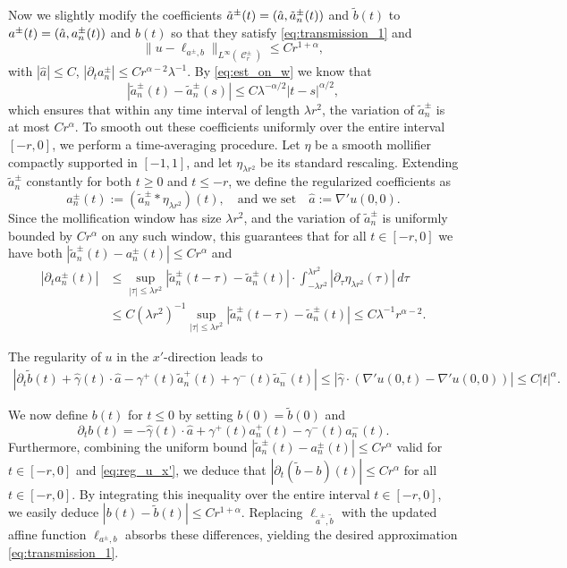 \documentclass[12pt]{article}
\makeatletter
\newenvironment{customproof}[1]{%
  \par\pushQED{\qed}%
  \normalfont\topsep6pt \trivlist
  \item[\hskip\labelsep\itshape
    Proof of #1\@addpunct{.}]\ignorespaces
}{%
  \popQED\endtrivlist\@endpefalse
}
\numberwithin{Theorem}{section}
\theoremstyle{definition}
\theoremstyle{remark}
\numberwithin{equation}{section}
\DeclareMathOperator{\C}{\mathcal{C}}
\newcommand{\p}{\partial}
\makeatother
\begin{document}
\begin{customproof}{Theorem \ref{Thm:C1gamma}}
Now we slightly modify the coefficients $\tilde a^\pm(t)=(\Hat{a},\tilde a_n^\pm(t))$ and $\tilde b(t)$ to  $a^\pm(t)=(\Hat{a}, a_n^\pm(t))$ and $b(t)$ so that they satisfy \eqref{eq:transmission_1} and 
    \[
    \| u - \ell_{a^{\pm},b} \|_{L^\infty( \C^{\pm}_r)} \leq C r^{1+{ \alpha}},
    \]
    with $|\hat a| \leq C$, $|\p_t a_n^{\pm}| \leq C r^{{ \alpha}-2} \lambda^{-1}$.
By \eqref{eq:est_on_w} we know that 
\[
|\tilde a_n^\pm(t)-\tilde a_n^\pm(s)|\leq C \lambda^{-\alpha/2}|t-s|^{\alpha/2},
\]
which ensures that within any time interval of length $\lambda r^2$, the variation of $\tilde a_n^\pm$ is at most $Cr^{ \alpha}$.
To smooth out these coefficients uniformly over the entire interval $[-r,0]$, we perform a time-averaging procedure. Let $\eta$ be a smooth mollifier compactly supported in $[-1,1]$, and let $\eta_{\lambda r^2}$ be its standard rescaling. Extending $\tilde a_n^\pm$ constantly for both $t \geq 0$ and $t \leq -r$, we define the regularized coefficients as
    \[
    a_n^\pm(t) := (\tilde a_n^\pm \ast \eta_{\lambda r^2})(t), \quad \text{and we set} \quad \hat a := \nabla'u(0,0).
    \]
Since the mollification window has size $\lambda r^2$, and the variation of $\tilde a_n^\pm$ is uniformly bounded by $C r^\alpha$ on any such window, this guarantees that for all $t \in [-r,0]$ we have both $|\tilde a_n^\pm(t) - a_n^\pm(t)| \leq Cr^{ \alpha}$  and 
\begin{equation} \label{bound_on_an'}
\begin{aligned}
   |\p_t a_n^\pm(t)| &\leq   \sup_{|\tau| \le \lambda r^2} |\tilde a_n^\pm(t-\tau) - \tilde a_n^\pm(t)|  \cdot \int_{-\lambda r^2}^{\lambda r^2} |\p_\tau \eta_{\lambda r^2}(\tau)| \, d\tau \\
   &\leq C (\lambda r^2)^{-1}\sup_{|\tau|\le \lambda r^2} |\tilde{a}_n^\pm(t-\tau) - \tilde{a}_n^\pm(t)|\leq  C \lambda^{-1} r^{\alpha - 2}.
\end{aligned}
\end{equation}

The regularity of $u$ in the $x'$-direction leads to
\begin{align} \label{eq:reg_u_x'}
    |\p_t \tilde b(t) +\hat{\gamma}(t) \cdot \hat{a} - \gamma^+(t) \tilde a_n^+(t) + \gamma^-(t) \tilde a_n^-(t)| \leq |\hat \gamma \cdot (\nabla' u(0,t)- \nabla' u(0,0))|\leq C|t|^{\alpha}.
\end{align}

We now define $b(t)$ for $t\leq 0$ by setting $b(0)=\tilde b(0)$ and 
\[
 \p_t b(t) = -\hat{\gamma}(t) \cdot \hat{a} + \gamma^+(t) a_n^+(t) - \gamma^-(t) a_n^-(t).
\]
Furthermore, combining the uniform bound $|\tilde a_n^\pm(t) - a_n^\pm(t)| \leq Cr^{ \alpha}$ valid for $t \in [-r,0]$ and \eqref{eq:reg_u_x'}, we deduce 
that $|\p_t (\tilde b - b)(t)|\leq Cr^\alpha$ for all $t \in [-r, 0]$.
By integrating this inequality over the entire interval $t \in [-r, 0]$, we easily deduce $|b(t) - \tilde b(t)| \leq Cr^{1+{ \alpha}}$. Replacing $\ell_{\tilde a^\pm, \tilde b}$ with the updated affine function $\ell_{a^\pm, b}$ absorbs these differences, yielding the desired approximation \eqref{eq:transmission_1}.


\end{customproof}
\end{document}
